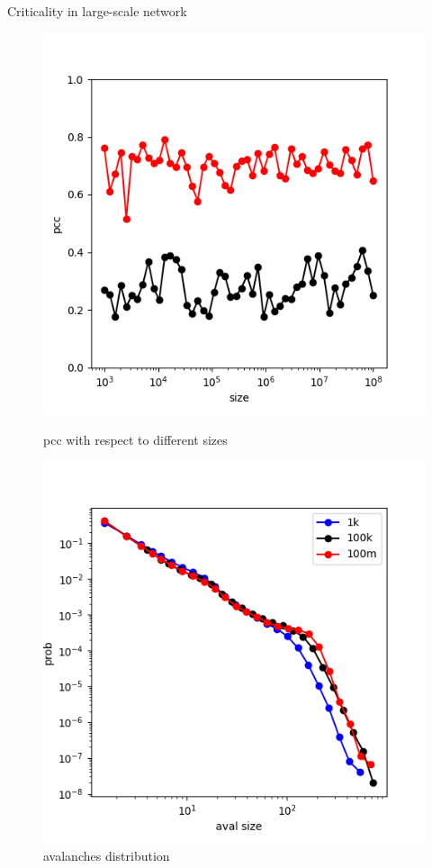 \documentclass{beamer}
\begin{document}
\begin{frame}{Criticality in large-scale network}
		\begin{figure}[htbp]
		\centering
		\begin{minipage}{0.49\linewidth}
			\centering
			\includegraphics[width=0.9\linewidth]{fig/size_influence}
			\caption{pcc with respect to different sizes}
		\end{minipage}
		\begin{minipage}{0.49\linewidth}
			\centering
			\includegraphics[width=0.9\linewidth]{fig/multi_size_avalanches}
			\caption{avalanches distribution}
		\end{minipage}
	\end{figure}
\end{frame}
\end{document}

